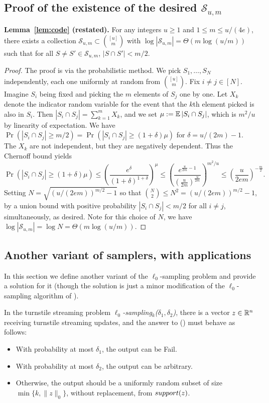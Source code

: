 \subsection{Proof of the existence of the desired $\mathcal S_{u,m}$}\label{sec:code}
\noindent \textbf{Lemma~\ref{lem:code} (restated).}
For any integers $u\ge 1$ and $1\le m\le u/(4e)$, there exists a collection $\mathcal S_{u,m} \subset \binom{[u]}m$ with $\log |\mathcal{S}_{u,m}| = \Theta(m\log(u/m))$ such that for all $S\neq S'\in \mathcal S_{u,m}$, $|S\cap S'| < m/2$.
\begin{proof}
The proof is via the probabilistic method. We pick $S_1,\ldots,S_N$ independently, each one uniformly at random from $\binom{[u]}m$. Fix $i\neq j\in[N]$. Imagine $S_i$ being fixed and picking the $m$ elements of $S_j$ one by one. Let $X_k$ denote the indicator random variable for the event that the $k$th element picked is also in $S_i$. Then $|S_i\cap S_j| = \sum_{k=1}^m X_k$, and we set $\mu:= \operatorname*{\mathbb{E}} |S_i\cap S_j|$, which is $m^2/u$ by linearity of expectation. We have $\Pr(|S_i \cap S_j| \ge m/2) = \Pr(|S_i\cap S_j| \ge (1+\delta)\mu)$ for $\delta = u/(2m) - 1$. The $X_k$ are not independent, but they are negatively dependent. Thus the Chernoff bound yields
$$
\Pr(|S_i\cap S_j| \ge (1+\delta)\mu) \le \left(\frac{e^{\delta}}{(1+\delta)^{1+\delta}}\right)^\mu \le \left(\frac{e^{\frac u{2m} - 1}}{(\frac u{2m})^{\frac u{2m}}}\right)^{m^2/u} \le \left(\frac u{2em}\right)^{-\frac m2} .
$$
Setting $N = \sqrt{(u/(2em))^{m/2} - 1}$ so that ${N \choose 2}\leq N^2=(u/(2em))^{m/2} - 1$, by a union bound with positive probability $|S_i\cap S_j| < m/2$ for all $i\neq j$, simultaneously, as desired. Note for this choice of $N$, we have $\log|\mathcal S_{u,m}| = \log N = \Theta(m\log(u/m))$.
\end{proof}

\subsection{Another variant of samplers, with applications}\label{sec:variant}

In this section we define another variant of the $\ell_0$-sampling problem and provide a solution for it (though the solution is just a minor modification of the $\ell_0$-sampling algorithm of \cite{JowhariST11}).

\begin{definition}
In the turnstile streaming problem {\em $\ell_0$-sampling$_k$($\delta_1,\delta_2$)}, there is a vector $z\in\mathbb{R}^n$ receiving turnstile streaming updates, and the answer to () must behave as follows:
\begin{itemize}
\item With probability at most $\delta_1$, the output can be \textsf{Fail}.
\item With probability at most $\delta_2$, the output can be arbitrary.
\item Otherwise, the output should be a uniformly random subset of size $\min\{k,\|z\|_0\}$, without replacement, from $\mathop{support}(z)$.
\end{itemize}
\end{definition}

